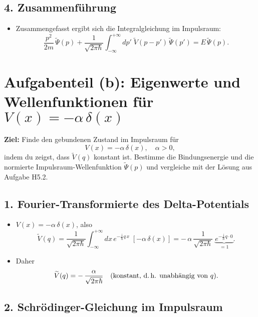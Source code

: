\documentclass[12pt,a4paper]{scrartcl}
\begin{document}
\subsection*{4. Zusammenführung}

\begin{itemize}
  \item Zusammengefasst ergibt sich die Integralgleichung im Impulsraum:
  \[
    \frac{p^2}{2m}\,\widetilde\Psi(p)
    + \frac{1}{\sqrt{2\pi\hbar}}\!\int_{-\infty}^{+\infty} dp'\;\widetilde V(p - p')\,\widetilde\Psi(p')
    = E\,\widetilde\Psi(p).
  \]
\end{itemize}

\section{Aufgabenteil (b): Eigenwerte und Wellenfunktionen für $V(x) = -\alpha\,\delta(x)$}

\textbf{Ziel:} Finde den gebundenen Zustand im Impulsraum für 
\[
  V(x) = -\alpha\,\delta(x), \quad \alpha > 0,
\]
indem du zeigst, dass $\widetilde V(q)$ konstant ist. Bestimme die Bindungsenergie und die normierte Impulsraum-Wellenfunktion $\widetilde\Psi(p)$ und vergleiche mit der Lösung aus Aufgabe H5.2.

\subsection*{1. Fourier-Transformierte des Delta-Potentials}

\begin{itemize}
  \item $V(x) = -\alpha\,\delta(x)$, also
  \[
    \widetilde V(q)
    = \frac{1}{\sqrt{2\pi\hbar}} \int_{-\infty}^{+\infty} dx\,e^{-\frac{\mathrm{i}}{\hbar}q\,x}\;[-\alpha\,\delta(x)]
    = -\,\alpha\,\frac{1}{\sqrt{2\pi\hbar}}\;\underbrace{e^{-\frac{\mathrm{i}}{\hbar}q\cdot 0}}_{=1}.
  \]
  \item Daher 
  \[
    \widetilde V(q) = -\,\frac{\alpha}{\sqrt{2\pi\hbar}}
    \quad\text{(konstant, d.\,h. unabhängig von }q\text{).}
  \]
\end{itemize}

\subsection*{2. Schrödinger-Gleichung im Impulsraum}
\end{document}
